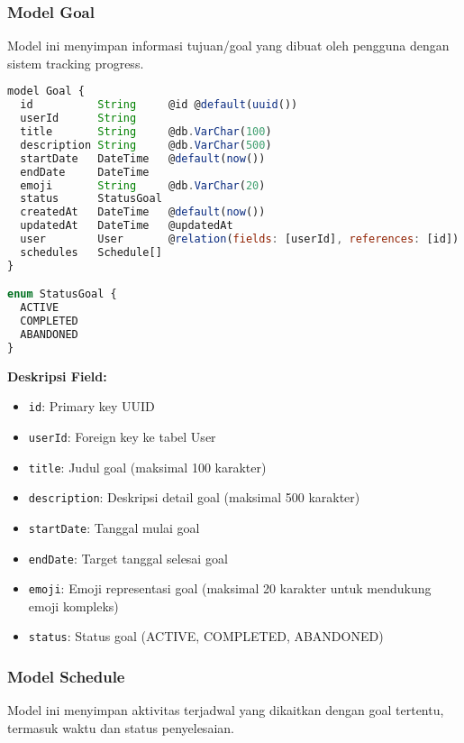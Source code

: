 \subsubsection{Model Goal}
Model ini menyimpan informasi tujuan/goal yang dibuat oleh pengguna dengan sistem tracking progress.

\begin{lstlisting}[language=JavaScript, caption=Skema Model Goal]
model Goal {
  id          String     @id @default(uuid())
  userId      String
  title       String     @db.VarChar(100)
  description String     @db.VarChar(500)
  startDate   DateTime   @default(now())
  endDate     DateTime
  emoji       String     @db.VarChar(20)
  status      StatusGoal
  createdAt   DateTime   @default(now())
  updatedAt   DateTime   @updatedAt
  user        User       @relation(fields: [userId], references: [id])
  schedules   Schedule[]
}

enum StatusGoal {
  ACTIVE
  COMPLETED
  ABANDONED
}
\end{lstlisting}

\textbf{Deskripsi Field:}
\begin{itemize}
\item \texttt{id}: Primary key UUID
\item \texttt{userId}: Foreign key ke tabel User
\item \texttt{title}: Judul goal (maksimal 100 karakter)
\item \texttt{description}: Deskripsi detail goal (maksimal 500 karakter)
\item \texttt{startDate}: Tanggal mulai goal
\item \texttt{endDate}: Target tanggal selesai goal
\item \texttt{emoji}: Emoji representasi goal (maksimal 20 karakter untuk mendukung emoji kompleks)
\item \texttt{status}: Status goal (ACTIVE, COMPLETED, ABANDONED)
\end{itemize}

\subsubsection{Model Schedule}
Model ini menyimpan aktivitas terjadwal yang dikaitkan dengan goal tertentu, termasuk waktu dan status penyelesaian.

